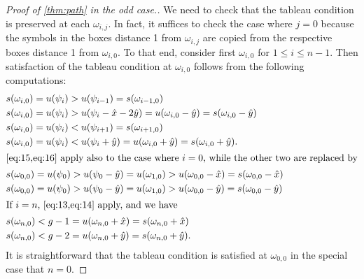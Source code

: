 \documentclass[11pt,reqno]{amsart}
\theoremstyle{definition}
\theoremstyle{problem}
\theoremstyle{plain}
\theoremstyle{remark}
\theoremstyle{theorem}
\numberwithin{equation}{section}
\numberwithin{figure}{section}
\theoremstyle{definition}
\theoremstyle{problem}
\theoremstyle{plain}
\begin{document}
\begin{proof}[Proof of \cref{thm:path} in the odd case.]
  We need to check that the tableau condition is preserved at each
  $\omega_{i,j}$.  In fact, it suffices to check the case where
  $j = 0$ because the symbols in the boxes distance 1 from
  $\omega_{i,j}$ are copied from the respective boxes distance 1 from
  $\omega_{i,0}$.  To that end, consider first $\omega_{i,0}$ for
  $1 \leq i \leq n-1$.  Then satisfaction of the tableau condition at
  $\omega_{i,0}$ follows from the following computations:
  \begin{align}
    \label{eq:13} &s(\omega_{i,0}) = u(\psi_i) > u(\psi_{i-1}) =
                    s(\omega_{i-1,0}) \\
    \label{eq:14} &s(\omega_{i,0}) = u(\psi_i) > u(\psi_i - \hat x
                    -2\hat y) = u(\omega_{i,0} - \hat y)
                    = s(\omega_{i,0} - \hat y) \\
    \label{eq:15} &s(\omega_{i,0}) = u(\psi_i) < u(\psi_{i+1}) =
                    s(\omega_{i+1,0}) \\
    \label{eq:16} &s(\omega_{i,0}) = u(\psi_i) < u(\psi_i + \hat y)
                    = u(\omega_{i,0} + \hat y)
                    = s(\omega_{i,0} + \hat y).\\
    \intertext{\cref{eq:15,eq:16} apply also to the case where
    $i = 0$, while the other two are replaced by}
    \label{eq:17} &s(\omega_{0,0}) = u(\psi_0) > u(\psi_0 - \hat y)
                    = u(\omega_{1,0}) > u(\omega_{0,0} - \hat x)
                    = s(\omega_{0,0} - \hat x)\\
    \label{eq:18} &s(\omega_{0,0}) = u(\psi_0) > u(\psi_0 - \hat y)
                    = u(\omega_{1,0}) > u(\omega_{0,0} - \hat y)
                    = s(\omega_{0,0} - \hat y) \\
    \intertext{If $i = n$, \cref{eq:13,eq:14} apply, and we have}
    \label{eq:19} &s(\omega_{n,0}) < g-1 = u(\omega_{n,0} + \hat x)
                    = s(\omega_{n,0} + \hat x) \\
    \label{eq:20} &s(\omega_{n,0}) < g-2 = u(\omega_{n,0} + \hat y)
                    = s(\omega_{n,0} + \hat y).
  \end{align}
  It is straightforward that the tableau condition is satisfied at
  $\omega_{0,0}$ in the special case that $n = 0$.
\end{proof}
\end{document}
